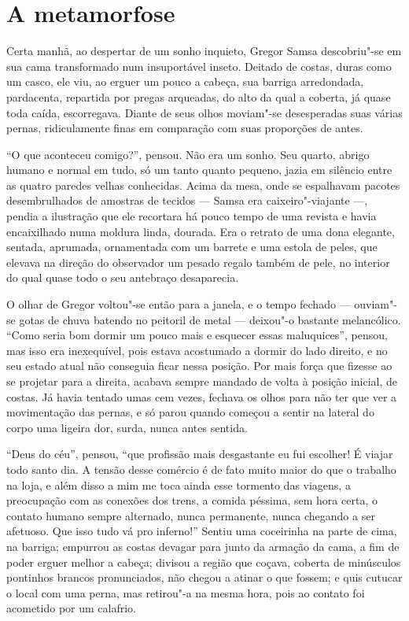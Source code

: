 
\part*{A metamorfose}

\sectionitem

Certa manhã, ao despertar de um sonho inquieto, Gregor Samsa descobriu"-se
em sua cama transformado num insuportável inseto. Deitado de costas, duras
como um casco, ele viu, ao erguer um pouco a cabeça, sua barriga arredondada,
pardacenta, repartida por pregas arqueadas, do alto da qual a coberta, já
quase toda caída, escorregava. Diante de seus olhos moviam"-se
desesperadas suas várias pernas, ridiculamente finas em comparação com
suas proporções de antes.

“O que aconteceu comigo?”, pensou. Não era um sonho. Seu quarto, abrigo
humano e normal em tudo, só um tanto quanto pequeno, jazia em silêncio
entre as quatro paredes velhas conhecidas. Acima da mesa, onde se
espalhavam pacotes desembrulhados de amostras de tecidos --- Samsa era
caixeiro"-viajante ---, pendia a ilustração que ele recortara há pouco tempo
de uma revista e havia encaixilhado numa moldura linda, dourada. Era o
retrato de uma dona elegante, sentada, aprumada, ornamentada com um
barrete e uma estola de peles, que elevava na direção do observador um
pesado regalo também de pele, no interior do qual quase todo o seu
antebraço desaparecia.

O olhar de Gregor voltou"-se então para a janela, e o tempo fechado ---
ouviam"-se gotas de chuva batendo no peitoril de metal --- deixou"-o bastante
melancólico. “Como seria bom dormir um pouco mais e esquecer
essas maluquices”, pensou, mas isso era inexequível, pois estava
acostumado a dormir do lado direito, e no seu estado atual não conseguia
ficar nessa posição. Por mais força que fizesse ao se projetar para a
direita, acabava sempre mandado de volta à posição inicial, de costas. Já
havia tentado umas cem vezes, fechava os olhos para não ter que ver a
movimentação das pernas, e só parou quando começou a sentir na
lateral do corpo uma
ligeira dor, surda, nunca antes sentida.

“Deus do céu”, pensou, “que profissão mais desgastante eu fui escolher! É
viajar todo santo dia. A tensão desse comércio é de fato muito maior do
que o trabalho na loja, e além disso a mim me toca ainda esse tormento das
viagens, a preocupação com as conexões dos trens, a comida péssima, sem
hora certa, o contato humano sempre alternado, nunca permanente, nunca
chegando a ser afetuoso. Que isso tudo vá pro inferno!” Sentiu uma
coceirinha na parte de cima, na barriga; empurrou as costas devagar para
junto da armação da cama, a fim de poder erguer melhor a cabeça; divisou a
região que coçava, coberta de minúsculos pontinhos brancos pronunciados,
não chegou a atinar o que fossem; e quis cutucar o local com uma perna,
mas retirou"-a na mesma hora, pois ao contato foi acometido por um
calafrio.

